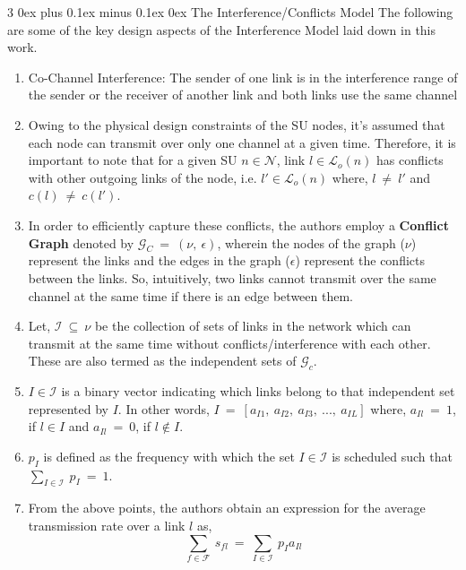 \documentclass[12pt, draftcls, onecolumn]{IEEEtran}
\makeatletter
\def\subsubsection{\@startsection{subsubsection}%
                                 {3}%
                                 {\z@}%
                                 {0ex plus 0.1ex minus 0.1ex}%
                                 {0ex}%
                                 {\normalfont\normalsize\bfseries}}%
\makeatother
\begin{document}
\subsubsection{The Interference/Conflicts Model}
The following are some of the key design aspects of the Interference Model laid down in this work.
\begin{enumerate}
    \item Co-Channel Interference: The sender of one link is in the interference range of the sender or the receiver of another link and both links use the same channel
    \item Owing to the physical design constraints of the SU nodes, it's assumed that each node can transmit over only one channel at a given time. Therefore, it is important to note that for a given SU $n \in \mathcal{N}$, link $l \in \mathcal{L}_o(n)$ has conflicts with other outgoing links of the node, i.e. $l' \in \mathcal{L}_o(n)$ where, $l\ \not=\ l'$ and $c(l)\ \not=\ c(l')$.
    \item In order to efficiently capture these conflicts, the authors employ a \textbf{Conflict Graph} denoted by $\mathcal{G}_C\ =\ (\nu,\ \epsilon)$, wherein the nodes of the graph ($\nu$) represent the links and the edges in the graph ($\epsilon$) represent the conflicts between the links. So, intuitively, two links cannot transmit over the same channel at the same time if there is an edge between them.
    \item Let, $\mathcal{I}\ \subseteq\ \nu$ be the collection of sets of links in the network which can transmit at the same time without conflicts/interference with each other. These are also termed as the independent sets of $\mathcal{G}_c$.
    \item $I \in \mathcal{I}$ is a binary vector indicating which links belong to that independent set represented by $I$. In other words, $I\ =\ [a_{I1},\ a_{I2},\ a_{I3},\ ...,\ a_{IL}]$ where, $a_{Il}\ =\ 1$, if $l \in I$ and $a_{Il}\ =\ 0$, if $l \not\in I$.
    \item $p_I$ is defined as the frequency with which the set $I \in \mathcal{I}$ is scheduled such that $\sum_{I \in \mathcal{I}}\ p_I\ =\ 1$.
    \item From the above points, the authors obtain an expression for the average transmission rate over a link $l$ as,
    \[\sum_{f \in \mathcal{F}}\ s_{fl}\ =\ \sum_{I \in \mathcal{I}}\ p_I a_{Il}\]
\end{enumerate}
\end{document}
